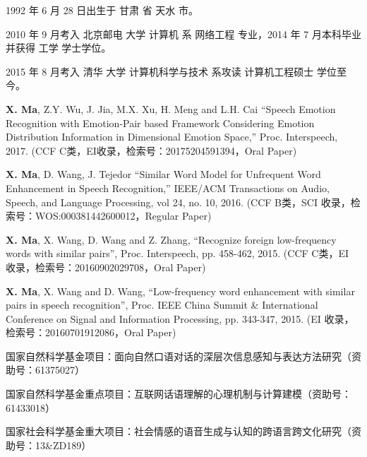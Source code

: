 \begin{resume}


  1992 年 6 月 28 日出生于 甘肃 省 天水 市。

  2010 年 9 月考入 北京邮电 大学 计算机 系 网络工程 专业，2014 年 7 月本科毕业并获得 工学 学士学位。

  2015 年 8 月考入 清华 大学 计算机科学与技术 系攻读 计算机工程硕士 学位至今。


  \begin{publications}
    \item \textbf{X. Ma}, Z.Y. Wu, J. Jia, M.X. Xu, H. Meng and L.H. Cai “Speech Emotion Recognition with Emotion-Pair based Framework Considering Emotion Distribution Information in Dimensional Emotion Space,” Proc. Interspeech, 2017. (CCF C类，EI收录，检索号：20175204591394，Oral Paper)
    \item \textbf{X. Ma}, D. Wang, J. Tejedor “Similar Word Model for Unfrequent Word Enhancement in Speech Recognition,” IEEE/ACM Transactions on Audio, Speech, and Language Processing, vol 24, no. 10, 2016. (CCF B类，SCI 收录，检索号：WOS:000381442600012，Regular Paper)
    \item \textbf{X. Ma}, X. Wang, D. Wang and Z. Zhang, “Recognize foreign low-frequency words with similar pairs”, Proc. Interspeech, pp. 458-462, 2015. (CCF C类，EI 收录，检索号：20160902029708，Oral Paper)
    \item \textbf{X. Ma}, X. Wang and D. Wang, “Low-frequency word enhancement with similar pairs in speech recognition”, Proc. IEEE China Summit \& International Conference on Signal and Information Processing, pp. 343-347, 2015. (EI 收录，检索号：20160701912086，Oral Paper)
  \end{publications}

  \begin{achievements}
    \item 国家自然科学基金项目：面向自然口语对话的深层次信息感知与表达方法研究（资助号：61375027）
    \item 国家自然科学基金重点项目：互联网话语理解的心理机制与计算建模（资助号：61433018）
    \item 国家社会科学基金重大项目：社会情感的语音生成与认知的跨语言跨文化研究（资助号：13\&ZD189）
  \end{achievements}


\end{resume}
